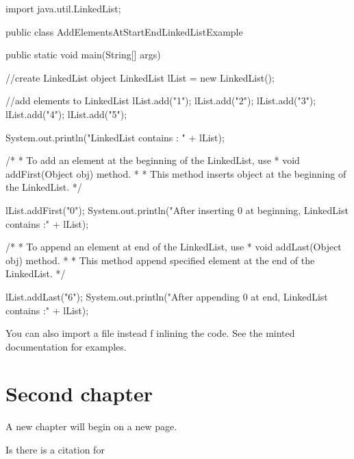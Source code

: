 \documentclass[a4paper,11pt]{report}
\begin{document}
\begin{javacode}
import java.util.LinkedList;
 
public class AddElementsAtStartEndLinkedListExample {
 
  public static void main(String[] args) {
 
    //create LinkedList object
    LinkedList lList = new LinkedList();
   
    //add elements to LinkedList
    lList.add("1");
    lList.add("2");
    lList.add("3");
    lList.add("4");
    lList.add("5");
   
    System.out.println("LinkedList contains : " + lList);
   
    /*
     * To add an element at the beginning of the LinkedList, use
     * void addFirst(Object obj) method.
     *
     * This method inserts object at the beginning of the LinkedList.
     */
   
     lList.addFirst("0");
     System.out.println("After inserting 0 at beginning, LinkedList contains :"
     + lList);
 
    /*
     * To append an element at end of the LinkedList, use
     * void addLast(Object obj) method.
     *
     * This method append specified element at the end of the LinkedList.
     */    
   
     lList.addLast("6");
     System.out.println("After appending 0 at end, LinkedList contains :" + lList);
 
  }
}
\end{javacode}

You can also import a file instead f inlining the code. See the minted documentation for examples.

\chapter{Second chapter}

A new chapter will begin on a new page.

Is there is a citation for \cite{hesso-latextemplate-pa}

\blindtext

\printbibliography
\end{document}
